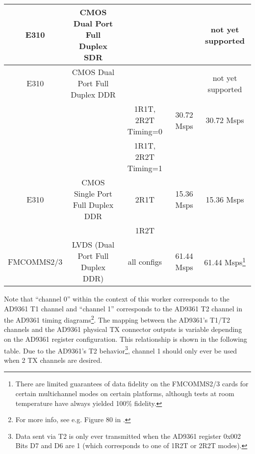 \documentclass{article}
\begin{document}
\begin{sloppypar}
\begin{scriptsize}
\begin{longtable}{|c|c|c|c|c|}
    \hline
    E310 & CMOS Dual   Port Full Duplex SDR &                   & & not yet supported  \\
    \hline
    E310 & CMOS Dual   Port Full Duplex DDR &                   & & not yet supported  \\
    \hline
         &                           & 1R1T, 2R2T Timing=0 & 30.72 Msps & 30.72 Msps \\
    \cline{2-5}
         &                           & 1R1T, 2R2T Timing=1 &            &            \\
    E310 & CMOS Single Port Full Duplex DDR & 2R1T                & 15.36 Msps & 15.36 Msps \\
         &                           & 1R2T                &            &            \\
    \hline
    FMCOMMS2/3 & LVDS (Dual Port Full Duplex DDR) & all configs         & 61.44 Msps & 61.44 Msps\footnote{There are limited guarantees of data fidelity on the FMCOMMS2/3 cards for certain multichannel modes on certain platforms, although tests at room temperature have always yielded 100\% fidelity.} \\
    \hline
	\end{longtable}
\end{scriptsize}
\pagebreak
Note that ``channel 0'' within the context of this worker corresponds to the AD9361 T1 channel and ``channel 1'' corresponds to the AD9361 T2 channel in the AD9361 timing diagrams\footnote{For more info, see e.g. Figure 80 in \cite{adi_ug570}.}. The mapping between the AD9361's T1/T2 channels and the AD9361 physical TX connector outputs is variable depending on the AD9361 register configuration. This relationship is shown in the following table.  Due to the AD9361's T2 behavior\footnote{\label{t2}Data sent via T2 is only ever transmitted when the AD9361 register 0x002 Bits D7 and D6 are 1 (which corresponds to one of 1R2T or 2R2T modes).}, channel 1 should only ever be used when 2 TX channels are desired.
\end{sloppypar}
\end{document}
